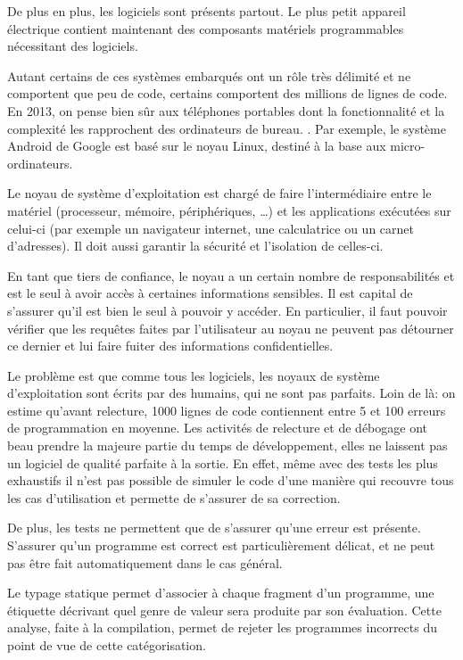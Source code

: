 De plus en plus, les logiciels sont présents partout. Le plus petit appareil
électrique contient maintenant des composants matériels programmables
nécessitant des logiciels.


Autant certains de ces systèmes embarqués ont un rôle très délimité et ne
comportent que peu de code, certains comportent des millions de lignes de code.
En 2013, on pense bien sûr aux téléphones portables dont la fonctionnalité et la
complexité les rapprochent des ordinateurs de bureau. . Par exemple, le système
Android de Google est basé sur le noyau Linux, destiné à la base aux
micro-ordinateurs.

Le noyau de système d'exploitation est chargé de faire l'intermédiaire entre le
matériel (processeur, mémoire, périphériques, …) et les applications exécutées
sur celui-ci (par exemple un navigateur internet, une calculatrice ou un carnet
d'adresses). Il doit aussi garantir la sécurité et l'isolation de celles-ci.

En tant que tiers de confiance, le noyau a un certain nombre de responsabilités
et est le seul à avoir accès à certaines informations sensibles. Il est capital
de s'assurer qu'il est bien le seul à pouvoir y accéder. En particulier, il faut
pouvoir vérifier que les requêtes faites par l'utilisateur au noyau ne peuvent
pas détourner ce dernier et lui faire fuiter des informations confidentielles.

Le problème est que comme tous les logiciels, les noyaux de système
d'exploitation sont écrits par des humains, qui ne sont pas parfaits. Loin de
là: on estime qu'avant relecture, 1000 lignes de code contiennent entre 5 et 100
erreurs de programmation en moyenne.
Les activités de relecture et de
débogage ont beau prendre la majeure partie du temps de développement, elles ne
laissent pas un logiciel de qualité parfaite à la sortie. En effet,
même avec des tests les plus exhaustifs il n'est pas possible de simuler le code
d'une manière qui recouvre tous les cas d'utilisation et permette de s'assurer
de sa correction.

De plus, les tests ne permettent que de s'assurer qu'une erreur est présente.
S'assurer qu'un programme est correct est particulièrement délicat, et ne peut
pas être fait automatiquement dans le cas général.

Le typage statique permet d'associer à chaque fragment d'un programme, une
étiquette décrivant quel genre de valeur sera produite par son évaluation. Cette
analyse, faite à la compilation, permet de rejeter les programmes incorrects du
point de vue de cette catégorisation.

